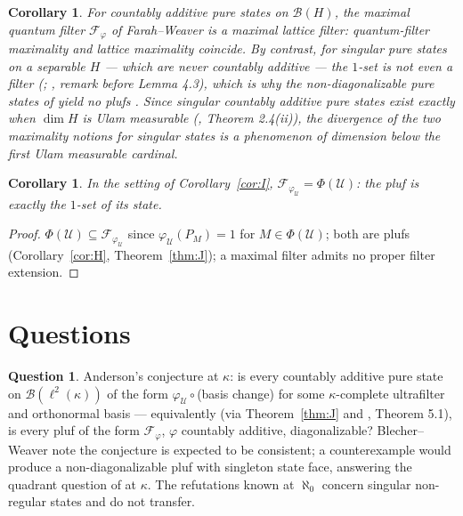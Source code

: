 \documentclass[11pt,reqno]{amsart}
\newtheorem{corollary}[theorem]{Corollary}
\theoremstyle{definition}
\newtheorem{question}[theorem]{Question}
\newcommand{\U}{\mathcal{U}}
\newcommand{\FF}{\mathcal{F}}
\newcommand{\Blk}{\mathcal{B}(\ell^2(\kappa))}
\begin{document}
\begin{corollary}\label{cor:coincide}
For countably additive pure states on $\mathcal B(H)$, the maximal quantum filter
$\FF_\varphi$ of Farah--Weaver \cite{FarahWofsey} \emph{is} a maximal lattice filter:
quantum-filter maximality and lattice maximality coincide. By contrast, for singular
pure states on a separable $H$ --- which are never countably additive --- the $1$-set
is not even a filter (\cite{FarahWofsey}; \cite{BlecherWeaver}, remark before Lemma
4.3), which is why the non-diagonalizable pure states of \cite{AW,Koszmider} yield no
plufs \cite{FWI}. Since singular countably additive pure states exist exactly when
$\dim H$ is Ulam measurable (\cite{BlecherWeaver}, Theorem 2.4(ii)), the divergence of
the two maximality notions for singular states is a phenomenon of dimension below the
first Ulam measurable cardinal.
\end{corollary}

\begin{corollary}\label{cor:Fphi-is-Phi}
In the setting of Corollary~\ref{cor:I}, $\FF_{\varphi_\U}=\Phi(\U)$: the pluf is
exactly the $1$-set of its state.
\end{corollary}

\begin{proof}
$\Phi(\U)\subseteq\FF_{\varphi_\U}$ since $\varphi_\U(P_M)=1$ for $M\in\Phi(\U)$;
both are plufs (Corollary~\ref{cor:H}, Theorem~\ref{thm:J}); a maximal filter admits
no proper filter extension.
\end{proof}

\section{Questions}\label{sec:questions}

\begin{question}\label{q:anderson}
Anderson's conjecture at $\kappa$: is every countably additive pure state on $\Blk$ of
the form $\varphi_\U\circ$(basis change) for some $\kappa$-complete ultrafilter and
orthonormal basis --- equivalently (via Theorem~\ref{thm:J} and \cite{FWII}, Theorem
5.1), is every pluf of the form $\FF_\varphi$, $\varphi$ countably additive,
diagonalizable? Blecher--Weaver note the conjecture is expected to be consistent; a
counterexample would produce a non-diagonalizable pluf with singleton state face,
answering the quadrant question of \cite{FWI} at $\kappa$. The refutations known at
$\aleph_0$ \cite{AW,Koszmider} concern singular non-regular states and do not
transfer.
\end{question}
\end{document}
